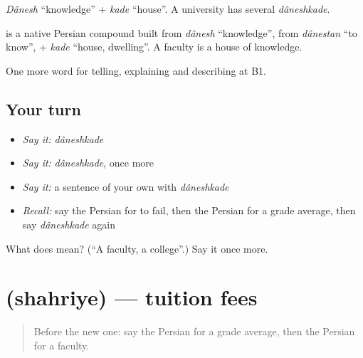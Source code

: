 \emph{Dânesh} \textquotedblleft{}knowledge\textquotedblright{} + \emph{kade} \textquotedblleft{}house\textquotedblright{}. A university has several \emph{dâneshkade}.

\begin{cousinweb}
\textbf{} is a native Persian compound built from \emph{dânesh} \textquotedblleft{}knowledge\textquotedblright{}, from \emph{dânestan} \textquotedblleft{}to know\textquotedblright{}, + \emph{kade} \textquotedblleft{}house, dwelling\textquotedblright{}. A faculty is a house of knowledge.
\end{cousinweb}

\begin{grammarlens}[title={What you've built}]
One more word for telling, explaining and describing at B1.
\end{grammarlens}

\subsection*{Your turn}
\begin{itemize}
\raggedright
  \item \emph{Say it:} \emph{dâneshkade}
  \item \emph{Say it:} \emph{dâneshkade}, once more
  \item \emph{Say it:} a sentence of your own with \emph{dâneshkade}
  \item \emph{Recall:} say the Persian for to fail, then the Persian for a grade average, then say \emph{dâneshkade} again
\end{itemize}

\begin{tcolorbox}[breakable,colback=teal!4,colframe=teal!35!black,title={Before you move on}]
What does  mean? (\textquotedblleft{}A faculty, a college\textquotedblright{}.) Say it once more.
\end{tcolorbox}
\section[\texorpdfstring{\fa{شهریه} (shahriye)}{شهریه (shahriye)}]{ (shahriye) — tuition fees}

\label{lesson:FA-C400-shahriye}



\begin{quote}
Before the new one: say the Persian for a grade average, then the Persian for a faculty.
\end{quote}


